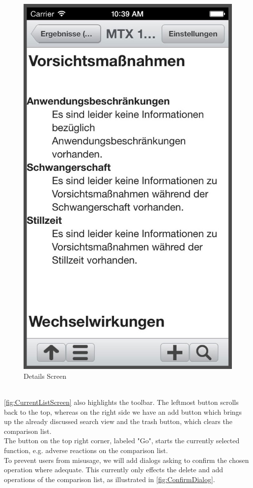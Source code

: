 \begin{figure}[ptb]
\begin{minipage}[b]{0.45\linewidth}
        \includegraphics[width=0.8025\linewidth]{figures/Detail_bw.jpg}
        \caption[Pharmaceutical Details Screen]{Details Screen}
        \label{fig:DetailsScreen}
    \end{minipage}
\end{figure}
\\
\ref{fig:CurrentListScreen} also highlights the toolbar. The leftmost button scrolls back to the top, whereas on the right side we have an add button which brings up the already discussed search view and the trash button, which clears the comparison list. 
\\
The button on the top right corner, labeled "Go", starts the currently selected function, e.g. adverse reactions on the comparison list.
\\
To prevent users from misusage, we will add dialogs asking to confirm the chosen operation where adequate. This currently only effects the delete and add operations of the comparison list, as illustrated in \ref{fig:ConfirmDialog}.
